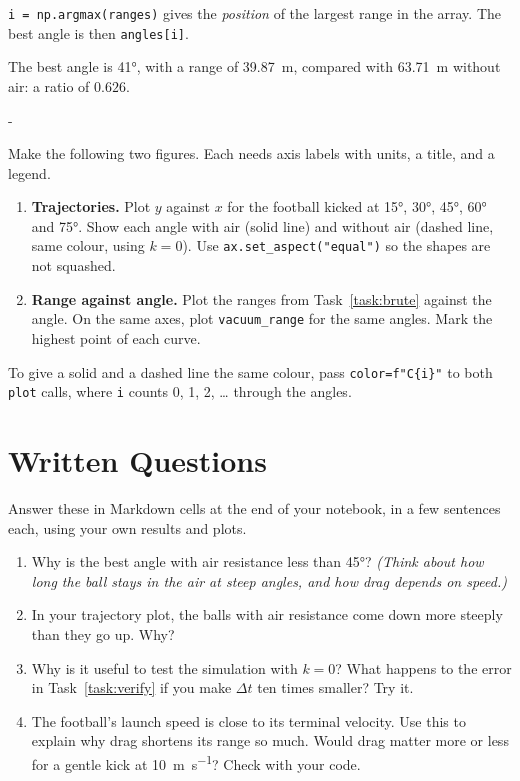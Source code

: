 \documentclass[11pt,a4paper]{article}
\makeatletter
\newcommand{\code}[1]{\texttt{\color{codetext}#1}}
\newcounter{task}
\newcommand{\task}[2][]{%
  \par\addvspace{1.2em}%
  \needspace{5\baselineskip}%
  \refstepcounter{task}%
  \noindent{\sffamily\bfseries\large%
    \colorbox{task}{\color{white}\strut\,TASK~\thetask\,}\enspace{\color{task}#2}}%
  \if\relax\detokenize{#1}\relax\else\label{#1}\fi%
  \par\nopagebreak\smallskip}
\newcommand{\needspace}[1]{\par\begingroup
  \setlength{\dimen@}{#1}\dimen@ii\pagegoal \advance\dimen@ii-\pagetotal
  \ifdim\dimen@>\dimen@ii \ifdim\dimen@ii>\z@ \vfil\fi \break\fi
  \endgroup}
\makeatother
\begin{document}
\begin{hint}
\code{i = np.argmax(ranges)} gives the \emph{position} of the largest range in the array. The best angle is then \code{angles[i]}.
\end{hint}

\begin{checkpoint}
The best angle is \ang{41}, with a range of \qty{39.87}{\metre}, compared with \qty{63.71}{\metre} without air: a ratio of $0.626$.
\end{checkpoint}

\task{Plots}
Make the following two figures. Each needs axis labels with units, a title, and a legend.
\begin{enumerate}
  \item \textbf{Trajectories.} Plot $y$ against $x$ for the football kicked at \ang{15}, \ang{30}, \ang{45}, \ang{60} and \ang{75}. Show each angle with air (solid line) and without air (dashed line, same colour, using $k = 0$). Use \code{ax.set\_aspect("equal")} so the shapes are not squashed.
  \item \textbf{Range against angle.} Plot the ranges from Task~\ref{task:brute} against the angle. On the same axes, plot \code{vacuum\_range} for the same angles. Mark the highest point of each curve.
\end{enumerate}

\begin{hint}
To give a solid and a dashed line the same colour, pass \code{color=f"C\{i\}"} to both \code{plot} calls, where \code{i} counts 0, 1, 2, \dots{} through the angles.
\end{hint}

\section{Written Questions}
Answer these in Markdown cells at the end of your notebook, in a few sentences each, using your own results and plots.
\begin{enumerate}
  \item Why is the best angle with air resistance less than \ang{45}? \emph{(Think about how long the ball stays in the air at steep angles, and how drag depends on speed.)}
  \item In your trajectory plot, the balls with air resistance come down more steeply than they go up. Why?
  \item Why is it useful to test the simulation with $k = 0$? What happens to the error in Task~\ref{task:verify} if you make $\Delta t$ ten times smaller? Try it.
  \item The football's launch speed is close to its terminal velocity. Use this to explain why drag shortens its range so much. Would drag matter more or less for a gentle kick at \qty{10}{\metre\per\second}? Check with your code.
\end{enumerate}
\end{document}
